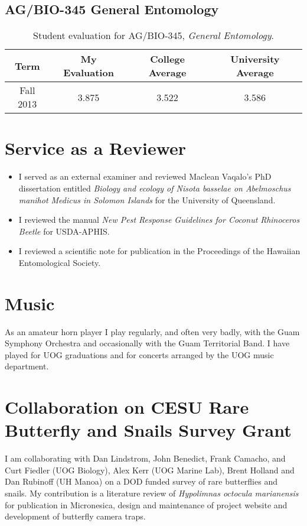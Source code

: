 \documentclass[12pt,oneside,english]{scrbook}
\begin{document}
\subsection{AG/BIO-345 General Entomology}

\begin{table}[h]
\protect\caption{\label{tab:Student-evaluation-agbio345}Student evaluation for AG/BIO-345, \emph{General Entomology}.}
\centering{}%
\begin{tabular}{cccc}
\hline 
Term & My Evaluation & College Average & University Average\tabularnewline
\hline 
Fall 2013 & 3.875 & 3.522 & 3.586\tabularnewline
\hline 
\end{tabular}
\end{table}


\section{Service as a Reviewer}

\begin{itemize}
	\item I served as an external examiner and reviewed Maclean Vaqalo's PhD dissertation entitled \emph{Biology and ecology of \textit{Nisota basselae} on \textit{Abelmoschus manihot} Medicus in Solomon Islands} for the University of Queensland.
	\item I reviewed the manual \emph{New Pest Response Guidelines for Coconut Rhinoceros Beetle} for USDA-APHIS.
	\item I reviewed a scientific note for publication in the Proceedings of the Hawaiian Entomological Society.
\end{itemize}


\section{Music}

As an amateur horn player I play regularly, and often very badly,
with the Guam Symphony Orchestra and occasionally with the Guam Territorial
Band. I have played for UOG graduations and for concerts arranged
by the UOG music department.

\section{Collaboration on CESU Rare Butterfly and Snails Survey Grant}

I am collaborating with Dan Lindstrom, John Benedict, Frank Camacho,
and Curt Fiedler (UOG Biology), Alex Kerr (UOG Marine Lab), Brent
Holland and Dan Rubinoff (UH Manoa) on a DOD funded survey of rare
butterflies and snails. My contribution is a literature review of
\emph{Hypolimnas octocula marianensis} for publication in Micronesica,
design and maintenance of project website and development of butterfly
camera traps.
\end{document}
